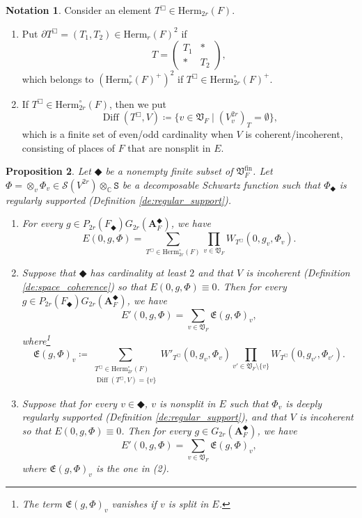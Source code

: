 \documentclass[12pt]{amsart}
\numberwithin{equation}{section}
\theoremstyle{plain}
\newtheorem{proposition}{Proposition}[section]
\theoremstyle{definition}
\newtheorem{notation}[proposition]{Notation}
\theoremstyle{remark}
\renewcommand{\b}[1]{\mathbf{#1}}
\renewcommand{\d}[1]{\mathbb{#1}}
\newcommand{\f}[1]{\mathfrak{#1}}
\renewcommand{\r}[1]{\mathrm{#1}}
\newcommand{\s}[1]{\mathscr{#1}}
\renewcommand{\(}{\left(}
\renewcommand{\)}{\right)}
\newcommand{\res}{\mathbin{|}}
\newcommand{\bA}{\b A}
\newcommand{\dC}{\d C}
\newcommand{\fE}{\f E}
\newcommand{\fV}{\f V}
\newcommand{\sS}{\s S}
\newcommand{\tS}{\mathtt{S}}
\newcommand{\fin}{\r{fin}}
\newcommand{\Herm}{\r{Herm}}
\DeclareMathOperator{\Diff}{Diff}
\begin{document}
\begin{notation}
Consider an element $T^\Box\in\Herm_{2r}(F)$.
\begin{enumerate}
  \item Put $\partial T^\Box=(T_1,T_2)\in\Herm_r(F)^2$ if
      \[
      T=\begin{pmatrix} T_1 & * \\ * & T_2 \end{pmatrix},
      \]
      which belongs to $(\Herm_r^\circ(F)^+)^2$ if $T^\Box\in\Herm_{2r}^\circ(F)^+$.

  \item If $T^\Box\in\Herm_{2r}^\circ(F)$, then we put
      \[
      \Diff(T^\Box,V)\coloneqq\{v\in\fV_F\res (V_v^{2r})_T=\emptyset\},
      \]
      which is a finite set of even/odd cardinality when $V$ is coherent/incoherent, consisting of places of $F$ that are nonsplit in $E$.
\end{enumerate}
\end{notation}


\begin{proposition}\label{pr:eisenstein_series}
Let $\Diamondblack$ be a nonempty finite subset of $\fV_F^{\fin}$. Let $\Phi=\otimes_v\Phi_v\in\sS(V^{2r})\otimes_\dC\tS$ be a decomposable Schwartz function such that $\Phi_\Diamondblack$ is regularly supported (Definition \ref{de:regular_support}).
\begin{enumerate}
  \item For every $g\in P_{2r}(F_\Diamondblack)G_{2r}(\bA_F^\Diamondblack)$, we have
      \[
      E(0,g,\Phi)=\sum_{T^\Box\in\Herm_{2r}^\circ(F)}\prod_{v\in\fV_F} W_{T^\Box}(0,g_v,\Phi_v).
      \]

  \item Suppose that $\Diamondblack$ has cardinality at least $2$ and that $V$ is incoherent (Definition \ref{de:space_coherence}) so that $E(0,g,\Phi)\equiv 0$. Then for every $g\in P_{2r}(F_\Diamondblack)G_{2r}(\bA_F^\Diamondblack)$, we have
      \[
      E'(0,g,\Phi)=\sum_{v\in\fV_F}\fE(g,\Phi)_v,
      \]
      where\footnote{The term $\fE(g,\Phi)_v$ vanishes if $v$ is split in $E$.}
      \[
      \fE(g,\Phi)_v\coloneqq\sum_{\substack{T^\Box\in\Herm_{2r}^\circ(F)\\\Diff(T^\Box,V)=\{v\}}}W'_{T^\Box}(0,g_v,\Phi_v)
      \prod_{v'\in\fV_F\setminus\{v\}} W_{T^\Box}(0,g_{v'},\Phi_{v'}).
      \]

  \item Suppose that for every $v\in\Diamondblack$, $v$ is nonsplit in $E$ such that $\Phi_v$ is deeply regularly supported (Definition \ref{de:regular_support}), and that $V$ is incoherent so that $E(0,g,\Phi)\equiv 0$. Then for every $g\in G_{2r}(\bA_F^\Diamondblack)$, we have
      \[
      E'(0,g,\Phi)=\sum_{v\in\fV_F}\fE(g,\Phi)_v,
      \]
      where $\fE(g,\Phi)_v$ is the one in (2).
\end{enumerate}
\end{proposition}
\end{document}
